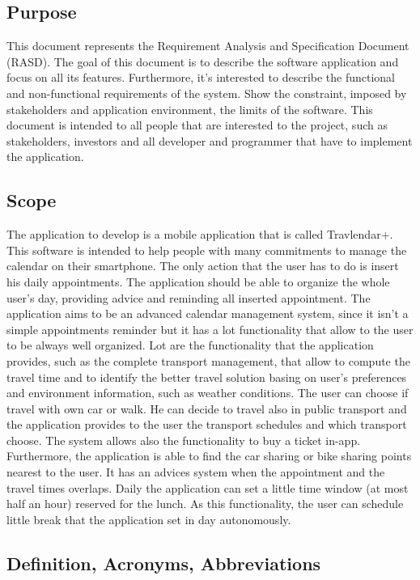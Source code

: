 \subsection{Purpose}
This document represents the Requirement Analysis and Specification Document (RASD). The goal of this document is to describe the software application and focus on all its features. Furthermore, it’s interested to describe the functional and non-functional requirements of the system.
Show the constraint, imposed by stakeholders and application environment, the limits of the software.
This document is intended to all people that are interested to the project, such as stakeholders, investors and all developer and programmer that have to implement the application.

\subsection{Scope}
The application to develop is a mobile application that is called Travlendar+. This software is intended to help people with many commitments to manage the calendar on their smartphone. 
The only action that the user has to do is insert his daily appointments. The application should be able to organize the whole user’s day, providing advice and reminding all inserted appointment.
The application aims to be an advanced calendar management system, since it isn’t a simple appointments reminder but it has a lot functionality that allow to the user to be always well organized.
Lot are the functionality that the application provides, such as the complete transport management, that allow to compute the travel time and to identify the better travel solution basing on user’s preferences and environment information, such as weather conditions.
The user can choose if travel with own car or walk. He can decide to travel also in public transport and the application provides to the user the transport schedules and which transport choose. The system allows also the functionality to buy a ticket in-app.
Furthermore, the application is able to find the car sharing or bike sharing points nearest to the user.
It has an advices system when the appointment and the travel times overlaps. 
Daily the application can set a little time window (at most half an hour) reserved for the lunch. As this functionality, the user can schedule little break that the application set in day autonomously.

\subsection{Definition, Acronyms, Abbreviations}
